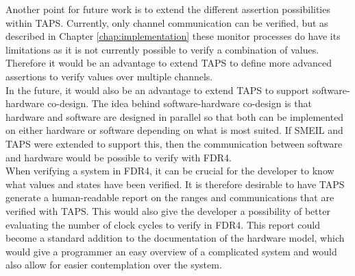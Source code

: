 Another point for future work is to extend the different assertion possibilities within TAPS. Currently, only channel communication can be verified, but as described in Chapter \ref{chap:implementation}
these monitor processes do have its limitations as it is not currently possible to verify a combination of values. Therefore it would be an advantage to extend TAPS to define more advanced assertions to verify values over multiple channels. \\

In the future, it would also be an advantage to extend TAPS to support software-hardware co-design. The idea behind software-hardware co-design is that hardware and software are designed in parallel so that both can be implemented on either hardware or software depending on what is most suited. If SMEIL and TAPS were extended to support this, then the communication between software and hardware would be possible to verify with FDR4. \\

When verifying a system in FDR4, it can be crucial for the developer to know what values and states have been verified. It is therefore desirable to have TAPS generate a human-readable report on the ranges and communications that are verified with TAPS. This would also give the developer a possibility of better evaluating the number of clock cycles to verify in FDR4.
This report could become a standard addition to the documentation of the hardware model, which would give a programmer an easy overview of a complicated system and would also allow for easier contemplation over the system.
